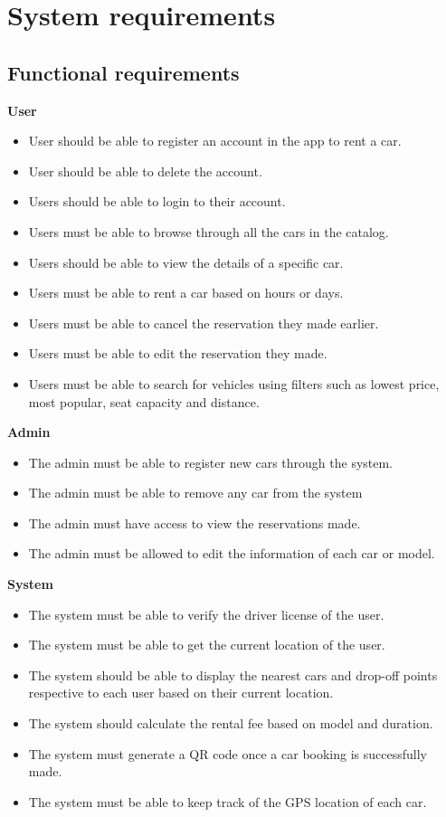 \documentclass{article}
\begin{document}
    
\section{System requirements}
    \subsection{Functional requirements}
        \textbf{User}
            \begin{itemize}
                \item User should be able to register an account in the app to rent a car.
                \item User should be able to delete the account.
                \item Users should be able to login to their account.
                \item Users must be able to browse through all the cars in the catalog.
                \item Users should be able to view the details of a specific car.
                \item Users must be able to rent a car based on hours or days.
                \item Users must be able to cancel the reservation they made earlier.
                \item Users must be able to edit the reservation they made.
                \item Users must be able to search for vehicles using filters such as lowest price, most popular, seat capacity and distance.
            \end{itemize}
        \textbf{Admin}
            \begin{itemize}
                \item The admin must be able to register new cars through the system.
                \item The admin must be able to remove any car from the system
                \item The admin must have access to view the reservations made.
                \item The admin must be allowed to edit the information of each car or model.
            \end{itemize}
        \textbf{System}
            \begin{itemize}
                \item The system must be able to verify the driver license of the user.
                \item The system must be able to get the current location of the user.
                \item The system should be able to display the nearest cars and drop-off points respective to each user based on their current location.
                \item The system should calculate the rental fee based on model and duration.
                \item The system must generate a QR code once a car booking is successfully made.
                \item The system must be able to keep track of the GPS location of each car.
            \end{itemize}
\end{document}
